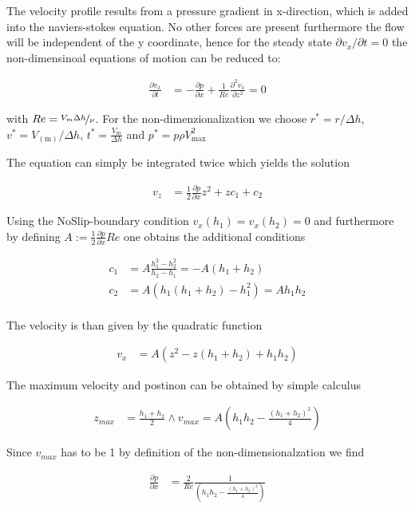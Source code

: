 The velocity profile results from a pressure gradient in x-direction, which is added into the naviers-stokes equation.
No other forces are present furthermore the flow will be independent of the y coordinate,
hence for the steady state $\partial v_x /\partial t = 0$ the non-dimensinoal equations of motion can be reduced to:

\begin{align}
\frac{\partial v_x}{\partial t} &= - \frac{\partial p}{\partial x}
 + \frac{1}{Re} \frac{\partial^2 v_x}{\partial z^2} = 0
\end{align}

with $Re = \nicefrac{V_{m}\Delta h}{\nu}$.
For the non-dimenzionalization we choose $r^* = r/\Delta h$, $v^*=V_(\text{m})/\Delta h$, $t^* = \frac{V_{\text{m}}}{\Delta h}$
and $p^* = p \rho V_{\text{max}}^2$

The equation can simply be integrated twice which yields the solution

\begin{align}
v_z &= \frac{1}{2}\frac{\partial p}{\partial x}z^2 + zc_1 + c_2
\end{align}

Using the NoSlip-boundary condition $v_x(h_1) = v_x(h_2) = 0$ and furthermore by defining
$A:=\frac{1}{2}\frac{\partial p}{\partial x} Re$ one obtains the additional conditions

\begin{align}
c_1 &= A\frac{h_1^2 -h_2^2}{h_2 - h_1} = -A(h_1+h_2)\\
c_2 &= A(h_1(h_1 + h_2) - h_1^2) = Ah_1h_2\\
\end{align}

The velocity is than given by the quadratic function

\begin{align}
v_x &= A(z^2 - z(h_1 + h_2) + h_1h_2)
\end{align}

The maximum velocity and postinon can be obtained by simple calculus

\begin{align}
z_{max} &= \frac{h_1+h_2}{2} \wedge v_{max} = A\left(h_1h_2 - \frac{(h_1 + h_2)^2}{4}\right)
\end{align}

Since $v_{max}$ has to be 1 by definition of the non-dimensionalzation we find

\begin{align}
\frac{\partial p}{\partial x} &= \frac{2}{Re}\frac{1}{\left(h_1h_2 - \frac{(h_1+h_2)^2}{4} \right)}
\end{align}

